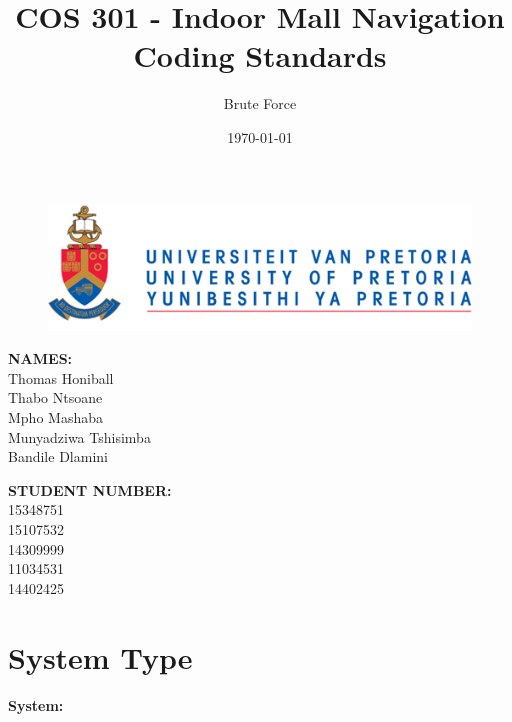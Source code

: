\documentclass{article}
\title{COS 301 - Indoor Mall Navigation Coding Standards}
\author{Brute Force}
\date{\today}
\begin{document}
	\maketitle
	
	\begin{figure}[!t]
		\includegraphics{up_logo.png}
	\end{figure}
	\begin{minipage}{0.4\textwidth}
		\begin{flushleft} \large
			\textbf{NAMES:}\\[0.4cm]
			Thomas Honiball\\
			Thabo Ntsoane\\
			Mpho Mashaba\\	
			Munyadziwa Tshisimba\\
			Bandile Dlamini

		\end{flushleft}
	\end{minipage}
	\begin{minipage}{0.4\textwidth}
		\begin{flushright} \large
			\textbf{STUDENT NUMBER:} \\[0.4cm]
		 	15348751\\ 	
		 	15107532\\		
		 	14309999\\		
		 	11034531\\	
		 	14402425
		\end{flushright}
	\end{minipage}

\maketitle

\pagebreak

\pagebreak
\tableofcontents
\pagebreak

\section{System Type}

\textbf{System:}
\end{document}

